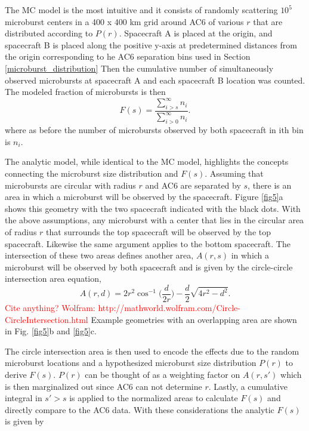 \documentclass[draft]{agujournal2019}
\begin{document}
The MC model is the most intuitive and it consists of randomly scattering $10^5$ microburst centers in a 400 x 400 km grid around AC6 of various $r$ that are distributed according to $P(r)$. Spacecraft A is placed at the origin, and spacecraft B is placed along the positive y-axis at predetermined distances from the origin corresponding to he AC6 separation bins used in Section \ref{microburst_distribution} Then the cumulative number of simultaneously observed microbursts at spacecraft A and each spacecraft B location was counted. The modeled fraction of microbursts is then
\begin{equation}
F(s) = \frac{\displaystyle\sum_{i > s}^\infty n_{i} }{ \displaystyle\sum_{i > 0}^\infty n_{i} }.
\end{equation} where as before the number of microbursts observed by both spacecraft in ith bin is $n_{i}$. 

The analytic model, while identical to the MC model, highlights the concepts connecting the microburst size distribution and $F(s)$. Assuming that microbursts are circular with radius $r$ and AC6 are separated by $s$, there is an area in which a microburst will be observed by the spacecraft. Figure \ref{fig5}a shows this geometry with the two spacecraft indicated with the black dots. With the above assumptions, any microburst with a center that lies in the circular area of radius $r$ that surrounds the top spacecraft will be observed by the top spacecraft. Likewise the same argument applies to the bottom spacecraft. The intersection of these two areas defines another area, $A(r, s)$ in which a microburst will be observed by both spacecraft and is given by the circle-circle intersection area equation, 
\begin{equation}
A(r, d) = 2r^2 \cos^{-1}{\Big( \frac{d}{2r} \Big)} - \frac{d}{2} \sqrt{4r^2 - d^2}.
\end{equation} \textcolor{red}{Cite anything? Wolfram: http://mathworld.wolfram.com/Circle-CircleIntersection.html} Example geometries with an overlapping area are shown in Fig. \ref{fig5}b and \ref{fig5}c.

The circle intersection area is then used to encode the effects due to the random microburst locations and a hypothesized microburst size distribution $P(r)$ to derive $F(s)$. $P(r)$ can be thought of as a weighting factor on $A(r, s')$ which is then marginalized out since AC6 can not determine $r$. Lastly, a cumulative integral in $s' > s$ is applied to the normalized areas to calculate $F(s)$ and directly compare to the AC6 data. With these considerations the analytic $F(s)$ is given by
\end{document}
